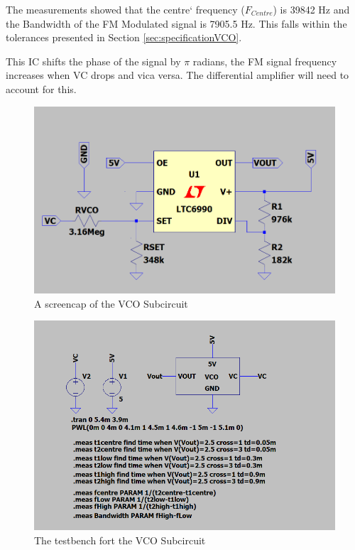 The measurements showed that the centre` frequency ($F_{Centre}$) is 39842 Hz and the Bandwidth of the FM Modulated signal is 7905.5 Hz.
This falls within the tolerances presented in Section \ref{sec:specificationVCO}.

This IC shifts the phase of the signal by $\pi$ radians, the FM signal frequency increases when VC drops and vica versa. 
The differential amplifier will need to account for this. 

\begin{figure}[H]
    \centering 
    \includegraphics[width=\textwidth]{../Circuits/Images/VCO/Schematic}
    \caption{A screencap of the VCO Subcircuit}
    \label{fig:VCOSchematic}
\end{figure}

\begin{figure}[H]
    \centering 
    \includegraphics[width=\textwidth]{../Circuits/Images/VCO/TestBenchScreencap}
    \caption{The testbench fort the VCO Subcircuit}
    \label{fig:VCOTestBench}
\end{figure}

